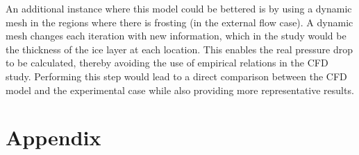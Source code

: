 \documentclass[11pt,a4paper,twoside,oneside]{article}
\begin{document}
An additional instance where this model could be bettered is by using a dynamic mesh in the regions where there is frosting (in the external flow case). A dynamic mesh changes each iteration with new information, which in the study would be the thickness of the ice layer at each location. This enables the real pressure drop to be calculated, thereby avoiding the use of empirical relations in the CFD study. Performing this step would lead to a direct comparison between the CFD model and the experimental case while also providing more representative results.







\clearpage
\thispagestyle{empty}

\cleardoublepage

\thispagestyle{plain}%

\printbibliography[heading=bibintoc]
% 
% 
\clearpage
\thispagestyle{empty}

\cleardoublepage

\thispagestyle{plain}



\appendix
\newrefsection


\section{Appendix}
\end{document}
